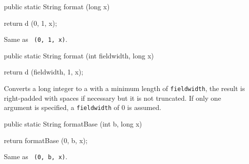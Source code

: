 \begin{htmlonly}
\end{htmlonly}
\begin{code}

   public static String format (long x)\begin{hide} {
      return d (0, 1, x);
   }\end{hide}
\end{code}
\begin{tabb}   Same as ~\texttt{(0, 1, x)}.
\end{tabb}
\begin{htmlonly}
\end{htmlonly}
\begin{code}

   public static String format (int fieldwidth, long x)\begin{hide} {
      return d (fieldwidth, 1, x);
   }\end{hide}
\end{code}
\begin{tabb} Converts a long integer to a  with a minimum length
of \texttt{fieldwidth}, the result is right-padded with spaces if
necessary but it is not truncated.  If only one argument is specified,
a \texttt{fieldwidth} of 0 is assumed.
\end{tabb}
\begin{htmlonly}
\end{htmlonly}
\begin{code}

   public static String formatBase (int b, long x)\begin{hide} {
      return formatBase (0, b, x);
   }\end{hide}
\end{code}
\begin{tabb}   Same as ~\texttt{(0, b, x)}.
\end{tabb}
